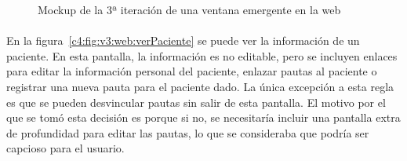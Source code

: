 \begin{figure}[H]
    \centering
    \caption[Mockup de la 3ª iteración de una ventana emergente en la web]{Mockup de la 3ª iteración de una ventana emergente en la web}
    \label{c4:fig:v3:web:ventanaEmergente}
\end{figure}

\paragraph{}
En la figura~\ref{c4:fig:v3:web:verPaciente} se puede ver la información de un paciente. En esta pantalla, la información es no editable, pero se incluyen enlaces para editar la información personal del paciente, enlazar pautas al paciente o registrar una nueva pauta para el paciente dado. La única excepción a esta regla es que se pueden desvincular pautas sin salir de esta pantalla. El motivo por el que se tomó esta decisión es porque si no, se necesitaría incluir una pantalla extra de profundidad para editar las pautas, lo que se consideraba que podría ser capcioso para el usuario.

